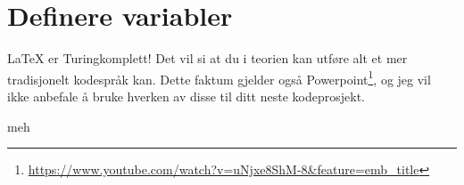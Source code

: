 \section{Definere variabler}
    \LaTeX\hspace{1pt} er Turingkomplett! Det vil si at du i teorien kan utføre alt et mer tradisjonelt kodespråk kan. Dette faktum gjelder også Powerpoint\footnote{\url{https://www.youtube.com/watch?v=uNjxe8ShM-8&feature=emb_title}}, og jeg vil ikke anbefale å bruke hverken av disse til ditt neste kodeprosjekt.
    
    
    \if
        meh 
    \fi
    
